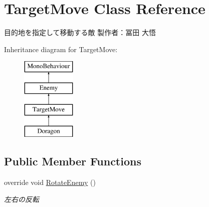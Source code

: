 \hypertarget{class_target_move}{}\section{Target\+Move Class Reference}
\label{class_target_move}


目的地を指定して移動する敵 製作者：冨田 大悟  


Inheritance diagram for Target\+Move\+:\begin{figure}[H]
\begin{center}
\leavevmode
\includegraphics[height=4.000000cm]{class_target_move}
\end{center}
\end{figure}
\subsection*{Public Member Functions}
\begin{DoxyCompactItemize}
\item 
override void \hyperlink{class_target_move_afb69b9930791bef6aaa96b8d92ce27c2}{Rotate\+Enemy} ()
\begin{DoxyCompactList}\small\item\em 左右の反転 \end{DoxyCompactList}\end{DoxyCompactItemize}
